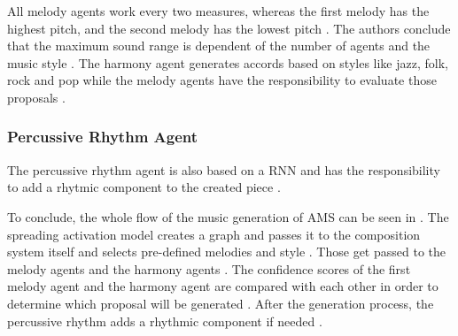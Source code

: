 All melody agents work every two measures, whereas the
first melody has the highest pitch, and the second melody 
has the lowest pitch \cite{hutMcCormAms}. The authors conclude that the 
maximum sound range is dependent of the number of agents
and the music style \cite{hutMcCormAms}.
The harmony agent generates accords based on styles like
jazz, folk, rock and pop while the melody agents 
have the responsibility to evaluate those proposals \cite{hutMcCormAms}.

\subsubsection{Percussive Rhythm Agent}

The percussive rhythm agent is also based on a RNN and
has the responsibility to add a rhytmic component to
the created piece \cite{hutMcCormAms}.



To conclude, the whole flow of the music generation of AMS can be seen in 
. The spreading activation model creates a graph
and passes it to the composition system itself and selects pre-defined melodies
and style \cite{hutMcCormAms}. Those get passed to the melody agents and the harmony agents \cite{hutMcCormAms}.
The confidence scores of the first melody agent and the harmony agent are compared
with each other in order to determine which proposal will be generated \cite{hutMcCormAms}.
After the generation process, the percussive rhythm adds a rhythmic component if needed \cite{hutMcCormAms}.






